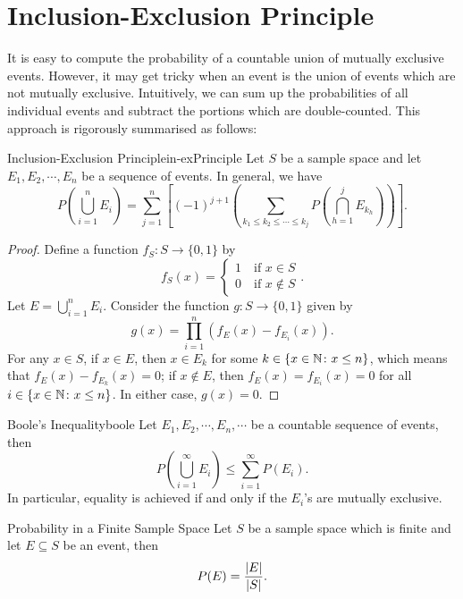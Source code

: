 \documentclass[math]{amznotes}
\theoremstyle{remark}
\begin{document}
\section{Inclusion-Exclusion Principle}
It is easy to compute the probability of a countable union of mutually exclusive events. However, it may get tricky when an event is the union of events which are not mutually exclusive. Intuitively, we can sum up the probabilities of all individual events and subtract the portions which are double-counted. This approach is rigorously summarised as follows:
\begin{thmbox}{Inclusion-Exclusion Principle}{in-exPrinciple}
    Let $S$ be a sample space and let $E_1, E_2, \cdots, E_n$ be a sequence of events. In general, we have
    \begin{equation*}
        P\left(\bigcup_{i = 1}^n E_i\right) = \sum_{j = 1}^{n} \left[(-1)^{j + 1}\left(\sum_{k_1 \leq k_2 \leq \cdots \leq k_j}P\left(\bigcap_{h = 1}^{j}E_{k_h}\right)\right)\right].
    \end{equation*}
    \tcblower
    \begin{proof}
        Define a function $f_S \colon S \to \{0, 1\}$ by
        \begin{equation*}
            f_S(x) = \begin{cases}
                1 \quad \textrm{if } x \in S \\
                0 \quad \textrm{if } x \notin S
            \end{cases}.
        \end{equation*}
        Let $E = \bigcup_{i = 1}^n E_i$. Consider the function $g \colon S \to \{0, 1\}$ given by
        \begin{displaymath}
            g(x) = \prod_{i = 1}^{n}\left(f_E(x) - f_{E_i}(x)\right).
        \end{displaymath}
        For any $x \in S$, if $x \in E$, then $x \in E_k$ for some $k \in \left\{x \in \mathbb{N} \colon x \leq n\right\}$, which means that $f_E(x) - f_{E_k}(x) = 0$; if $x \notin E$, then $f_E(x) = f_{E_i}(x) = 0$ for all $i \in \left\{x \in \mathbb{N} \colon x \leq n\right\}$. In either case, $g(x) = 0$.
    \end{proof}
\end{thmbox}
\begin{thmbox}{Boole's Inequality}{boole}
    Let $E_1, E_2, \cdots, E_n, \cdots$ be a countable sequence of events, then
    \begin{equation*}
        P\left(\bigcup_{i = 1}^\infty E_i\right) \leq \sum_{i = 1}^{\infty}P(E_i).
    \end{equation*}
    In particular, equality is achieved if and only if the $E_i$'s are mutually exclusive.
\end{thmbox}
\begin{thmbox}{Probability in a Finite Sample Space}
    Let $S$ be a sample space which is finite and let $E \subseteq S$ be an event, then 
    \begin{equation*}
        P(E) = \frac{{\left\lvert {E} \right\rvert}}{{\left\lvert {S} \right\rvert}}.
    \end{equation*}
\end{thmbox}
\end{document}
